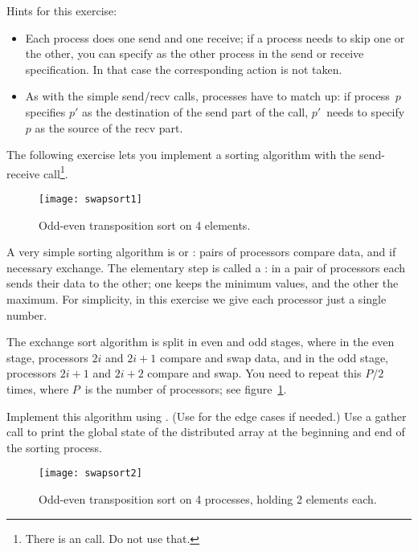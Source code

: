 Hints for this exercise:
\begin{itemize}
\item Each process does one send and one receive; if a process needs
  to skip one or the other, you can specify
   as the other process in the send or
  receive specification. In that case the corresponding action
  is not taken.
\item As with the simple send/recv calls, processes have to match up:
  if process~$p$ specifies $p'$ as the destination of the send part of
  the call, $p'$~needs to specify $p$ as the source of the recv part.
\end{itemize}

The following exercise lets you implement a sorting algorithm with the
send-receive call\footnote {There is an 
  call. Do not use that.}.

\begin{figure}[ht]
  \texttt{[image: swapsort1]}
  \caption{Odd-even transposition sort on 4 elements.}
  \label{fig:swapsort1}
\end{figure}

\begin{exercise}
  \label{ex:exchangesort}
  A very simple sorting algorithm is  or
  :
  pairs of processors compare data, and if necessary exchange. The
  elementary step is called a : in a pair
  of processors each sends their data to the other; one keeps the
  minimum values, and the other the maximum.
  For simplicity, in this exercise we give each processor just a single number.

  The exchange sort algorithm is split in even and odd stages, where
  in the even stage, processors $2i$ and $2i+1$ compare and swap data,
  and in the odd stage, processors $2i+1$ and $2i+2$ compare and swap.
  You need to repeat this $P/2$ times, where $P$~is the number of
  processors; see figure~\ref{fig:swapsort1}.

  Implement this algorithm using . (Use
   for the edge cases if needed.)
  Use a gather call to print the global state of the distributed array
  at the beginning and end of the sorting process.
\end{exercise}

\begin{figure}[ht]
  \texttt{[image: swapsort2]}
  \caption{Odd-even transposition sort on 4 processes, holding 2 elements each.}
  \label{fig:swapsort2}
\end{figure}

